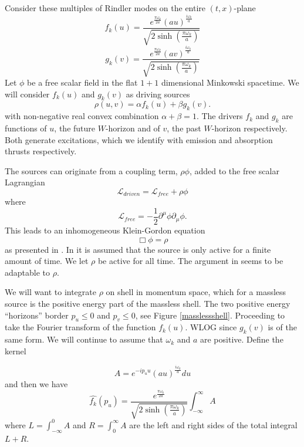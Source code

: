 \documentclass[12pt,a4paper]{article}
\begin{document}
Consider these multiples of Rindler modes on the entire $(t,x)$-plane
\begin{equation}
f_k(u) = \frac{e^{\frac{\pi \omega_k}{2a}} {(au)}^{\frac{i\omega_k}{a}}}{ \sqrt{2\sinh\left(\frac{\pi\omega_k}{a}\right)}}
\end{equation}
\begin{equation}
g_k(v) = \frac{e^{\frac{\pi \omega_k}{2a}} {(av)}^{\frac{i\omega_k}{a}}}{ \sqrt{2\sinh\left(\frac{\pi\omega_k}{a}\right)} }
\end{equation}
Let $\phi$ be a free scalar field in the flat $1+1$ dimensional Minkowski spacetime.  We will consider $f_k(u)$ and $g_k(v)$ as driving sources
\begin{equation}
\label{ab}
\rho(u,v) = \alpha f_k(u) + \beta g_k(v).
\end{equation}
with non-negative real convex combination $\alpha + \beta = 1$. The drivers $f_k$ and $g_k$ are functions of $u$, the future $W$-horizon and of $v$, the past $W$-horizon respectively.  Both generate excitations, which we identify with emission and absorption thrusts respectively.


The sources can originate from a coupling term, $\rho \phi$, added to the free scalar Lagrangian
\begin{equation}
\mathscr{L}_{driven} = \mathscr{L}_{free} + \rho\phi 
\end{equation}
where
\begin{equation}
  \mathscr{L}_{free} = -\frac{1}{2} \partial^\mu \phi \partial_\mu \phi.
\end{equation}
This leads to an inhomogeneous Klein-Gordon equation
\begin{equation}
\Box  \phi = \rho
\end{equation}
as presented in \cite{beisert}.  In \cite{beisert} it is assumed that the source is only active for a finite amount of time.  We let $\rho$ be active for all time.  The argument in \cite{beisert} seems to be adaptable to $\rho$.

We will want to integrate $\rho$ on shell in momentum space, which for a massless source is the positive energy part of the massless shell.  The two positive energy ``horizons'' border $p_u \le 0$ and $p_v \le 0$, see Figure \ref{masslessshell}.  Proceeding to take the Fourier transform of the function $f_k(u)$.  WLOG since $g_k(v)$ is of the same form.  We will continue to assume that $\omega_k$ and $a$ are positive. Define the kernel

\begin{equation}
  A = e^{-i p_u u} (au)^\frac{i\omega_k}{a} du
\end{equation}
and then we have
\begin{equation}
\label{finalnorm}
  \hat{f_k}(p_u) =  \frac{e^{\frac{\pi \omega_k}{2a}}}{\sqrt{2 \sinh \left({\frac{\pi\omega_k}{a}}\right)}}  \int_{-\infty}^\infty A
\end{equation}
where $L=\int_{-\infty}^0 A$ and $R=\int_0^\infty A$ are the left and right sides of the total integral $L + R$.
\end{document}
